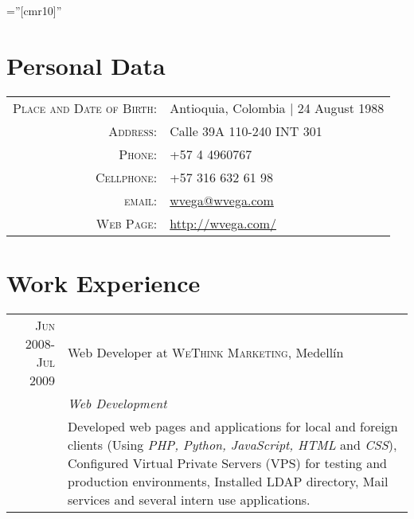 \documentclass[letter,10pt]{article}
\begin{document}
\pagestyle{empty} %

\font\fb=''[cmr10]'' %

\par{\par}
\par{\bigskip\par}

\section{Personal Data}

\begin{tabular}{rl}
    \textsc{Place and Date of Birth:} & Antioquia, Colombia  | 24 August 1988 \\
    \textsc{Address:}   & Calle 39A 110-240 INT 301\\
    \textsc{Phone:}     & +57 4 4960767\\
    \textsc{Cellphone:} & +57 316 632 61 98\\
    \textsc{email:}     & \href{mailto:wvega@wvega.com}{wvega@wvega.com}\\
    \textsc{Web Page:}  & \href{http://wvega.com/}{http://wvega.com/}
\end{tabular}

\section{Work Experience}
\begin{tabular}{r|p{11cm}}
 \textsc{Jun 2008-Jul 2009} & Web Developer at \textsc{WeThink Marketing}, Medellín \\&\emph{Web Development}\\&\footnotesize{Developed web pages and applications for local and foreign clients (Using \textit{PHP, Python, JavaScript, HTML} and \textit{CSS}), Configured Virtual Private Servers (VPS) for testing and production environments, Installed LDAP directory, Mail services and several intern use applications.}%
\end{tabular}
\end{document}
